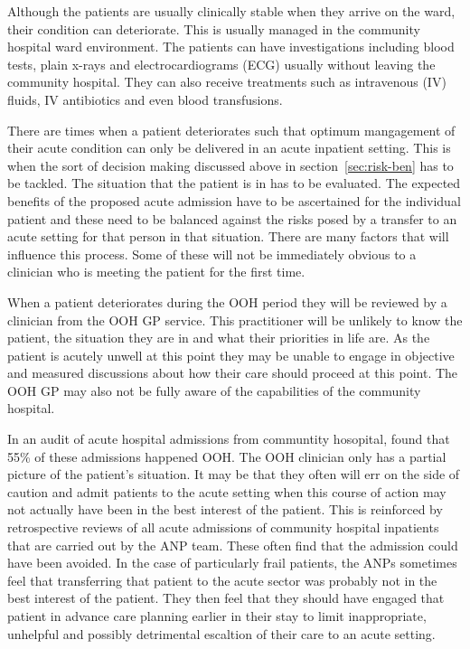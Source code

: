 \documentclass
[
	12pt,
	a4paper,
	oneside,
]{report}
\begin{document}
Although the patients are usually clinically stable when they arrive on the ward,
their condition can deteriorate. This is usually managed in the community hospital
ward environment. The patients can have investigations including blood tests, plain
x-rays and electrocardiograms (ECG) usually without leaving the community hospital.
They can also receive treatments such as intravenous (IV) fluids, IV antibiotics
and even blood transfusions.

There are times when a patient deteriorates such that optimum mangagement of their
acute condition can only be delivered in an acute inpatient setting. This is when 
the sort of decision making discussed above in section~\ref{sec:risk-ben} has
to be tackled. The situation that the patient is in has to be evaluated. The 
expected benefits of the proposed acute admission have to be ascertained for the
individual patient and these need to be balanced against the risks posed by a transfer
to an acute setting for that person in that situation. There are many factors that 
will influence this process. Some of these will not be immediately obvious to a 
clinician who is meeting the patient for the first time.

When a patient deteriorates during the OOH period they will be reviewed by a clinician
from the OOH GP service. This practitioner will be unlikely to know the patient,
the situation they are in and what their priorities in life are. As the patient is
acutely unwell at this point they may be unable to engage in objective and measured
discussions about how their care should proceed at this point. The OOH GP may also
not be fully aware of the capabilities of the community hospital. 

In an audit of acute hospital admissions from communtity hosopital,
\textcite{endacott:15} found that 55\% of these admissions happened OOH. 
The OOH clinician only has a partial picture of the patient's situation. It may 
be that they often will err on the side of caution and
admit patients to the acute setting when this course of action may not actually have
been in the best interest of the patient. This is reinforced by retrospective reviews
of all acute admissions of community hospital inpatients that are carried out by the 
ANP team. These often find that the admission could have been avoided. In the case
of particularly frail patients, the ANPs sometimes feel that transferring that
patient to the acute sector was probably not in the best interest of the patient. 
They then feel that they should have engaged that patient in advance care planning
earlier in their stay to limit inappropriate, unhelpful and possibly detrimental 
escaltion of their care to an acute setting.
\end{document}
